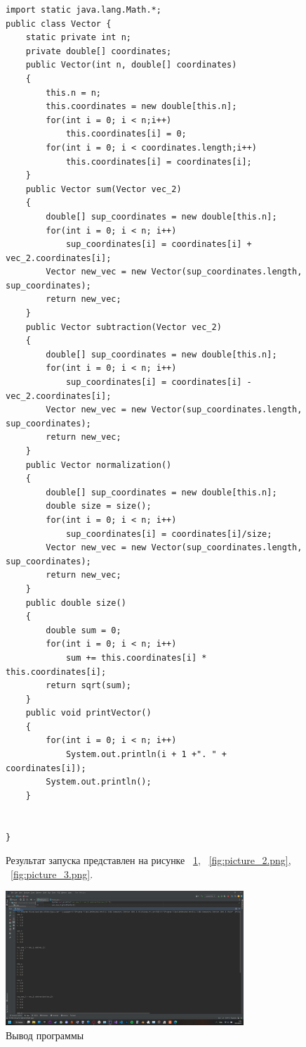 \documentclass[a4paper, 14pt]{extarticle}
\begin{document}
\begin{figure}[!htb]
\begin{lstlisting}[language={},caption={класс Vector},label={lst:code3}]
import static java.lang.Math.*;
public class Vector {
    static private int n;
    private double[] coordinates;
    public Vector(int n, double[] coordinates)
    {
        this.n = n;
        this.coordinates = new double[this.n];
        for(int i = 0; i < n;i++)
            this.coordinates[i] = 0;
        for(int i = 0; i < coordinates.length;i++)
            this.coordinates[i] = coordinates[i];
    }
    public Vector sum(Vector vec_2)
    {
        double[] sup_coordinates = new double[this.n];
        for(int i = 0; i < n; i++)
            sup_coordinates[i] = coordinates[i] + vec_2.coordinates[i];
        Vector new_vec = new Vector(sup_coordinates.length, sup_coordinates);
        return new_vec;
    }
    public Vector subtraction(Vector vec_2)
    {
        double[] sup_coordinates = new double[this.n];
        for(int i = 0; i < n; i++)
            sup_coordinates[i] = coordinates[i] - vec_2.coordinates[i];
        Vector new_vec = new Vector(sup_coordinates.length, sup_coordinates);
        return new_vec;
    }
    public Vector normalization()
    {
        double[] sup_coordinates = new double[this.n];
        double size = size();
        for(int i = 0; i < n; i++)
            sup_coordinates[i] = coordinates[i]/size;
        Vector new_vec = new Vector(sup_coordinates.length, sup_coordinates);
        return new_vec;
    }
    public double size()
    {
        double sum = 0;
        for(int i = 0; i < n; i++)
            sum += this.coordinates[i] * this.coordinates[i];
        return sqrt(sum);
    }
    public void printVector()
    {
        for(int i = 0; i < n; i++)
            System.out.println(i + 1 +". " + coordinates[i]);
        System.out.println();
    }

    
} 
\end{lstlisting}
\end{figure}

\begin{figure}[!htb]
Результат запуска представлен на рисунке ~\ref{fig:picture_1.png}, ~\ref{fig:picture_2.png}, ~\ref{fig:picture_3.png}.
\end{figure}

\begin{figure}[!htb]
	\centering
	\includegraphics[width=0.8\textwidth]{picture_1.png}
\caption{Вывод программы}
\label{fig:picture_1.png}
\end{figure}
\end{document}
